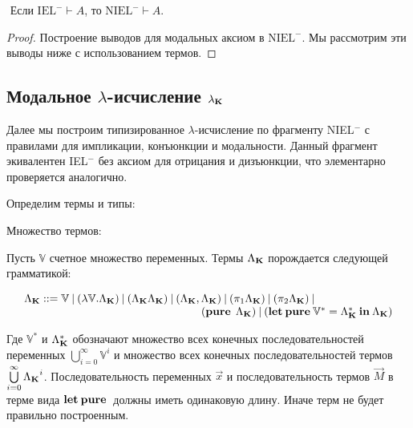 \begin{lemma}
$ $
Если $\text{IEL}^{-} \vdash A$, то $\text{NIEL}^{-} \vdash A$.
\end{lemma}

\begin{proof}
Построение выводов для модальных аксиом в $\text{NIEL}^{-}$. Мы рассмотрим эти выводы ниже с использованием термов.
\end{proof}

\vspace{\baselineskip}

\subsection{Модальное $\lambda$-исчисление $\lambda_{\bf K}$}

Далее мы построим типизированное $\lambda$-исчисление по фрагменту NIEL$^{-}$ с правилами для импликации, конъюнкции и модальности.
Данный фрагмент экивалентен IEL$^{-}$ без аксиом для отрицания и дизъюнкции,
что элементарно проверяется аналогично.

Определим термы и типы:

\vspace{\baselineskip}

\begin{defin} Множество термов:

Пусть $\mathbb{V}$ счетное множество переменных. Термы $\Lambda_{{\bf K}}$ порождается следующей грамматикой:

$\begin{array}{lll}
& \Lambda_{{\bf K}} ::= \mathbb{V} \: | \:  (\lambda \mathbb{V}.\Lambda_{{\bf K}}) \: | \: (\Lambda_{{\bf K}}\Lambda_{{\bf K}}) \: | \: (\Lambda_{{\bf K}} , \Lambda_{{\bf K}}) \: | \: (\pi_1 \Lambda_{{\bf K}}) \: | \: (\pi_2 \Lambda_{{\bf K}}) \: | & \\
& \quad\quad\quad\quad\quad\quad\quad\quad\quad\quad\quad\quad\quad\quad\quad\quad ({\bf pure \: } \: \Lambda_{{\bf K}}) \: | \: ({\bf let \: pure \:} \mathbb{V}^{*} = \Lambda_{{\bf K}}^{*} {\: \bf in \:} \Lambda_{{\bf K}})
\end{array}$

\end{defin}

Где $\mathbb{V}^{*}$ и $\Lambda_{{\bf K}}^{*}$ обозначают множество всех конечных последовательностей переменных $\bigcup \limits_{i=0}^{\infty} \mathbb{V}^i$
и множество всех конечных последовательностей термов $\bigcup \limits_{i = 0}^{\infty} {\Lambda_{{\bf K}}}^i $. Последовательность переменных $\vec{x}$ и последовательность термов $\vec{M}$ в терме вида ${\bf let \: pure \:}$ должны иметь одинаковую длину.
Иначе терм не будет правильно построенным.

